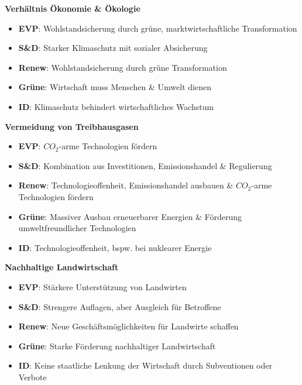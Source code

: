 \documentclass[11pt]{article}
\newcommand{\themeOne}{Verhältnis \newline Ökonomie \& Ökologie}
\newcommand{\themeTwo}{Vermeidung von Treibhausgasen}
\newcommand{\themeThree}{Nachhaltige Landwirtschaft}
\newcommand{\evpOne}{\small Wohlstandsicherung durch grüne, marktwirtschaftliche Transformation}
\newcommand{\evpTwo}{\small $CO_2$-arme Technologien fördern}
\newcommand{\evpThree}{\small Stärkere Unterstützung von Landwirten}
\newcommand{\sdOne}{\small Starker Klimaschutz mit sozialer Absicherung}
\newcommand{\sdTwo}{\small Kombination aus Investitionen, Emissionshandel \& Regulierung}
\newcommand{\sdThree}{\small Strengere Auflagen, aber Ausgleich für Betroffene}
\newcommand{\reOne}{\small Wohlstandsicherung durch grüne Transformation}
\newcommand{\reTwo}{\small Technologieoffenheit, Emissionshandel ausbauen \& $CO_2$-arme Technologien fördern}
\newcommand{\reThree}{\small Neue Geschäftsmöglichkeiten für Landwirte schaffen}
\newcommand{\greenOne}{\small Wirtschaft muss Menschen \& Umwelt dienen}
\newcommand{\greenTwo}{\small Massiver Ausbau erneuerbarer Energien \& Förderung umweltfreundlicher Technologien}
\newcommand{\greenThree}{\small Starke Förderung nachhaltiger Landwirtschaft}
\newcommand{\idOne}{\small Klimaschutz behindert wirtschaftliches Wachstum}
\newcommand{\idTwo}{\small Technologieoffenheit, bspw. bei nuklearer Energie}
\newcommand{\idThree}{\small Keine staatliche Lenkung der Wirtschaft durch Subventionen oder Verbote}
\newcommand{\themeOne}{Lastenverteilung \newline in der EU}
\newcommand{\themeTwo}{Ausmaß der Kontrolle der EU-Außengrenzen}
\newcommand{\themeThree}{Strenge bezüglich Asylanträge \& Rückführungen}
\newcommand{\evpOne}{\small Fester Verteilungsmechanismus \& Asyl- und Migrationsfonds}
\newcommand{\evpTwo}{\small Stärkere Kontrolle \& Drittstaatenverfahren}
\newcommand{\evpThree}{\small Schnellere Rückführungen \& einheitliche Aufnahmebedingungen}
\newcommand{\sdOne}{\small Fester Verteilungsmechanismus, Asyl- und Migrationsfonds \& Unterstützung belastete Staaten}
\newcommand{\sdTwo}{\small Gesicherte Grenzen, aber keine Drittstaatenverfahren}
\newcommand{\sdThree}{\small Unterstützung bei Antrag \& Integration durch EASO}
\newcommand{\reOne}{\small Fester Verteilungsmechanismus \& Asyl- und Migrationsfonds}
\newcommand{\reTwo}{\small Stärkere Kontrolle \& Drittstaatenverfahren}
\newcommand{\reThree}{\small Schnellere Rückführungen \& einheitliche Aufnahmebedingungen}
\newcommand{\greenOne}{\small Fester Verteilungsmechanismus, Asyl- und Migrationsfonds \& Unterstützung belastete Staaten}
\newcommand{\greenTwo}{\small Ausbau der Seenotrettung \& Verhinderung von Drittstaatenverfahren}
\newcommand{\greenThree}{\small Humane Aufnahme von Schutzsuchenden \& Wahrung der Menschenrechte bei Rückführungen}
\newcommand{\idOne}{\small Keinerlei Verpflichtung der Mitgliedstaaten}
\newcommand{\idTwo}{\small Verhinderung illegaler Migration durch Abschottung}
\newcommand{\idThree}{\small Schnelle Rückführungen, maximal temporäre Aufnahme}
\newcommand{\themeOne}{Internationale \newline Kooperation}
\newcommand{\themeTwo}{Militärische vs. zivile Interventionen}
\newcommand{\themeThree}{Erhöhung von Verteidigungsausgaben}
\newcommand{\evpOne}{\small Ergänzung mit NATO \& keine Parallelstrukturen}
\newcommand{\evpTwo}{\small EU muss Truppen in Krisensituationen schicken können}
\newcommand{\evpThree}{\small Sowohl auf europäischer als auch nationaler Ebene}
\newcommand{\sdOne}{\small Ergänzung mit NATO \& keine Parallelstrukturen}
\newcommand{\sdTwo}{\small Auch Diplomatie \& Friedenssicherung vorantreiben}
\newcommand{\sdThree}{\small Sowohl auf europäischer als auch nationaler Ebene, aber v.a. effizientere Ausgaben}
\newcommand{\reOne}{\small Ergänzung mit NATO, aber selbstständige EU}
\newcommand{\reTwo}{\small Militärische Verteidigung der EU \& Unterstützung Verbündeter essenziell}
\newcommand{\reThree}{\small Sowohl auf europäischer als auch nationaler Ebene, aber v.a. effizientere Ausgaben}
\newcommand{\greenOne}{\small Enge Zusammenarbeit mit Demokratien, keine Waffen an Diktaturen}
\newcommand{\greenTwo}{\small Auch Diplomatie, Umweltschutz \& Entwicklungshilfe für langfristige Sicherheit}
\newcommand{\greenThree}{\small Eher verstärkte EU-Kooperation, um Ausgaben effizienter zu nutzen}
\newcommand{\idOne}{\small NATO nur als Verteidigungsbündnis \& eigenständige nationale Diplomatie}
\newcommand{\idTwo}{\small Militärische Landesverteidigung \& friedliche Zusammenarbeit}
\newcommand{\idThree}{\small Nationale Entscheidung über Verteidigungsausgaben}
\begin{document}
\hfill
\begin{minipage}[t]{0.45\textwidth}
    \textbf{\Large \themeOne}
    \raggedright
    \begin{itemize}
        \item \textbf{EVP}: \evpOne
        \item \textbf{S\&D}: \sdOne
        \item \textbf{Renew}: \reOne
        \item \textbf{Grüne}: \greenOne
        \item \textbf{ID}: \idOne
    \end{itemize}
    \textbf{\Large \themeTwo}
    \raggedright
    \begin{itemize}
        \item \textbf{EVP}: \evpTwo
        \item \textbf{S\&D}: \sdTwo
        \item \textbf{Renew}: \reTwo
        \item \textbf{Grüne}: \greenTwo
        \item \textbf{ID}: \idTwo
    \end{itemize}
    \textbf{\Large \themeThree}
    \raggedright
    \begin{itemize}
        \item \textbf{EVP}: \evpThree
        \item \textbf{S\&D}: \sdThree
        \item \textbf{Renew}: \reThree
        \item \textbf{Grüne}: \greenThree
        \item \textbf{ID}: \idThree
    \end{itemize}
\end{minipage}
\end{document}
